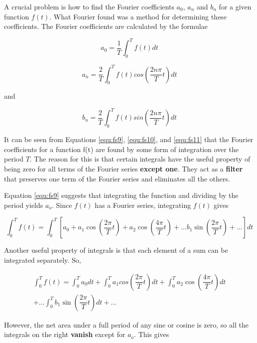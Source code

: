 A crucial problem is how to find the Fourier coefficients $a_0$, $a_n$ and $b_n$ for a given function $f(t)$. What Fourier found was a method for determining these coefficients. The Fourier coefficients are calculated by the formulae

\begin{equation}
a_0=\dfrac{1}{T}\int_0^Tf(t)dt
\label{equ:fs9}
\end{equation}

\begin{equation}
a_n=\dfrac{2}{T}\int_0^Tf(t)cos\left(\dfrac{2n\pi}{T}t\right)dt
\label{equ:fs10}
\end{equation}

and

\begin{equation}
b_n=\dfrac{2}{T}\int_0^Tf(t)sin\left(\dfrac{2n\pi}{T}t\right)dt
\label{equ:fs11}
\end{equation}

It can be seen from Equations \ref{equ:fs9}, \ref{equ:fs10}, and \ref{equ:fs11} that the Fourier coefficients for a function f(t) are found by some form of integration over the period $T$. The reason for this is that certain integrals have the useful property of being zero for all terms of the Fourier series {\bf except one}. They act as a {\bf filter} that preserves one term of the Fourier series and eliminates all the others.

Equation \ref{equ:fs9} suggests that integrating the function and dividing by the period yields $a_o$. Since $f(t)$ has a Fourier series, integrating $f(t)$ gives

\footnotesize
\begin{equation}
\int_0^Tf(t)=\int_0^T\left[a_0+a_1\cos\left(\dfrac{2\pi}{T}t\right)+a_2\cos\left(\dfrac{4\pi}{T}t\right)+...b_1\sin\left(\dfrac{2\pi}{T}t\right)+...\right]dt
\label{equ:fs12}
\end{equation}
\normalsize

Another useful property of integrals is that each element of a sum can be integrated separately. So,

\small
\begin{multline}
\int_0^Tf(t)=\int_0^Ta_0dt+\int_0^Ta_1cos\left(\dfrac{2\pi}{T}t\right)dt
+\int_0^Ta_2\cos\left(\dfrac{4\pi}{T}t\right)dt\\+...\int_0^Tb_1\sin\left(\dfrac{2\pi}{T}t\right)dt+...
\label{equ:fs13}
\end{multline}
\normalsize

However, the net area under a full period of any sine or cosine is zero, so all the integrals on the right {\bf vanish} except for $a_o$. This gives

